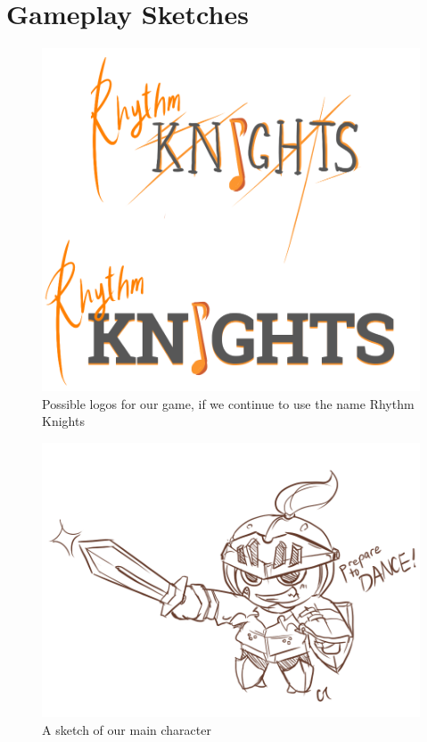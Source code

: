 \documentclass[]{article}
\begin{document}
\pagebreak
\section*{Gameplay Sketches}
\begin{figure}[!htb]
\begin{center}
\leavevmode
\includegraphics{img/logo.jpg}
\end{center}
\caption{Possible logos for our game, if we continue to use the name 
Rhythm Knights \label{logo}}
\end{figure}

\begin{figure}[!htb]
\begin{center}
\leavevmode
\includegraphics{img/main_char.jpg}
\end{center}
\caption{A sketch of our main character \label{logo}}
\end{figure}
\end{document}
